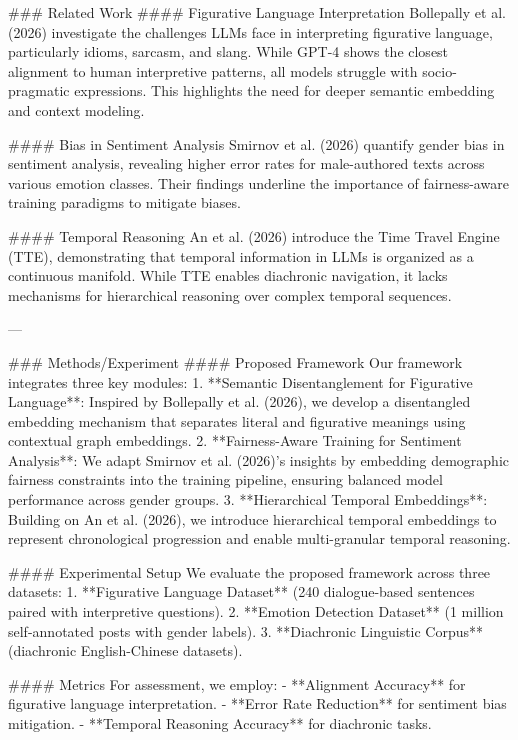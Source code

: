 ### Related Work  
#### Figurative Language Interpretation  
Bollepally et al. (2026) investigate the challenges LLMs face in interpreting figurative language, particularly idioms, sarcasm, and slang. While GPT-4 shows the closest alignment to human interpretive patterns, all models struggle with socio-pragmatic expressions. This highlights the need for deeper semantic embedding and context modeling.

#### Bias in Sentiment Analysis  
Smirnov et al. (2026) quantify gender bias in sentiment analysis, revealing higher error rates for male-authored texts across various emotion classes. Their findings underline the importance of fairness-aware training paradigms to mitigate biases.

#### Temporal Reasoning  
An et al. (2026) introduce the Time Travel Engine (TTE), demonstrating that temporal information in LLMs is organized as a continuous manifold. While TTE enables diachronic navigation, it lacks mechanisms for hierarchical reasoning over complex temporal sequences.

---

### Methods/Experiment  
#### Proposed Framework  
Our framework integrates three key modules:  
1. **Semantic Disentanglement for Figurative Language**: Inspired by Bollepally et al. (2026), we develop a disentangled embedding mechanism that separates literal and figurative meanings using contextual graph embeddings.  
2. **Fairness-Aware Training for Sentiment Analysis**: We adapt Smirnov et al. (2026)'s insights by embedding demographic fairness constraints into the training pipeline, ensuring balanced model performance across gender groups.  
3. **Hierarchical Temporal Embeddings**: Building on An et al. (2026), we introduce hierarchical temporal embeddings to represent chronological progression and enable multi-granular temporal reasoning.

#### Experimental Setup  
We evaluate the proposed framework across three datasets:  
1. **Figurative Language Dataset** (240 dialogue-based sentences paired with interpretive questions).  
2. **Emotion Detection Dataset** (1 million self-annotated posts with gender labels).  
3. **Diachronic Linguistic Corpus** (diachronic English-Chinese datasets).  

#### Metrics  
For assessment, we employ:  
- **Alignment Accuracy** for figurative language interpretation.  
- **Error Rate Reduction** for sentiment bias mitigation.  
- **Temporal Reasoning Accuracy** for diachronic tasks.

